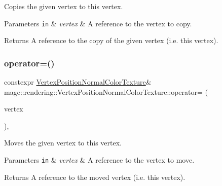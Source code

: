 Copies the given vertex to this vertex.


\begin{DoxyParams}[1]{Parameters}
\mbox{\tt in}  & {\em vertex} & A reference to the vertex to copy. \\
\hline
\end{DoxyParams}
\begin{DoxyReturn}{Returns}
A reference to the copy of the given vertex (i.\+e. this vertex). 
\end{DoxyReturn}
\hypertarget{structmage_1_1rendering_1_1_vertex_position_normal_color_texture_af737420814ca919b77b9b3593bd9a88b}{}\label{structmage_1_1rendering_1_1_vertex_position_normal_color_texture_af737420814ca919b77b9b3593bd9a88b} 
\subsubsection{\texorpdfstring{operator=()}{operator=()}\hspace{0.1cm}{\footnotesize\ttfamily [2/2]}}
{\footnotesize\ttfamily constexpr \hyperlink{structmage_1_1rendering_1_1_vertex_position_normal_color_texture}{Vertex\+Position\+Normal\+Color\+Texture}\& mage\+::rendering\+::\+Vertex\+Position\+Normal\+Color\+Texture\+::operator= (\begin{DoxyParamCaption}\item[{\hyperlink{structmage_1_1rendering_1_1_vertex_position_normal_color_texture}{Vertex\+Position\+Normal\+Color\+Texture} \&\&}]{vertex }\end{DoxyParamCaption})\hspace{0.3cm}{\ttfamily [default]}, {\ttfamily [noexcept]}}

Moves the given vertex to this vertex.


\begin{DoxyParams}[1]{Parameters}
\mbox{\tt in}  & {\em vertex} & A reference to the vertex to move. \\
\hline
\end{DoxyParams}
\begin{DoxyReturn}{Returns}
A reference to the moved vertex (i.\+e. this vertex). 
\end{DoxyReturn}


